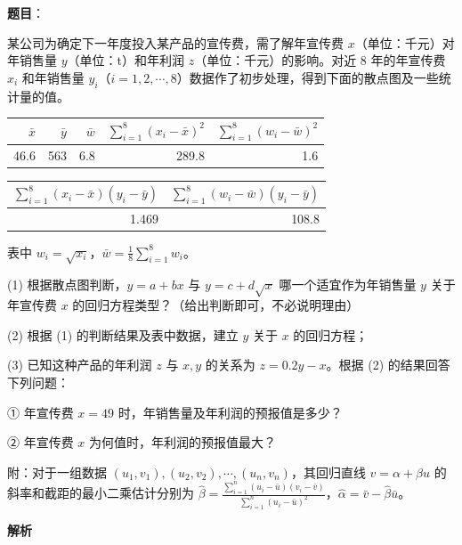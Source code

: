\begin{answer}

\textbf{题目}：

某公司为确定下一年度投入某产品的宣传费，需了解年宣传费 $x$（单位：千元）对年销售量 $y$（单位：t）和年利润 $z$（单位：千元）的影响。对近 8 年的年宣传费 $x_i$ 和年销售量 $y_i$（$i=1,2,\cdots,8$）数据作了初步处理，得到下面的散点图及一些统计量的值。
\nopagebreak[4]
\begin{center}\end{center}
\nopagebreak[4]
\begin{center}
\begin{tabular}{rrrrr}
\toprule
$\bar x$ & $\bar y$ & $\bar w$ & $\sum_{i=1}^{8}(x_i-\bar x)^2$ & $\sum_{i=1}^{8}(w_i-\bar w)^2$ \\
\midrule
46.6 & 563 & 6.8 & 289.8 & 1.6 \\
\bottomrule
\end{tabular}
\end{center}

\begin{center}
\begin{tabular}{rr}
\toprule
$\sum_{i=1}^{8}(x_i-\bar x)(y_i-\bar y)$ & $\sum_{i=1}^{8}(w_i-\bar w)(y_i-\bar y)$ \\
\midrule
1.469 & 108.8 \\
\bottomrule
\end{tabular}
\end{center}

表中 $w_i=\sqrt{x_i}$，$\bar w=\frac18\sum_{i=1}^{8}w_i$。

(1) 根据散点图判断，$y=a+bx$ 与 $y=c+d\sqrt x$ 哪一个适宜作为年销售量 $y$ 关于年宣传费 $x$ 的回归方程类型？（给出判断即可，不必说明理由）

(2) 根据 (1) 的判断结果及表中数据，建立 $y$ 关于 $x$ 的回归方程；

(3) 已知这种产品的年利润 $z$ 与 $x,y$ 的关系为 $z=0.2y-x$。根据 (2) 的结果回答下列问题：

① 年宣传费 $x=49$ 时，年销售量及年利润的预报值是多少？

② 年宣传费 $x$ 为何值时，年利润的预报值最大？

附：对于一组数据 $(u_1,v_1),(u_2,v_2),\cdots,(u_n,v_n)$，其回归直线 $v=\alpha+\beta u$ 的斜率和截距的最小二乘估计分别为 $\hat\beta=\frac{\sum_{i=1}^{n}(u_i-\bar u)(v_i-\bar v)}{\sum_{i=1}^{n}(u_i-\bar u)^2}$，$\hat\alpha=\bar v-\hat\beta\bar u$。

\textbf{解析}


\end{answer}
